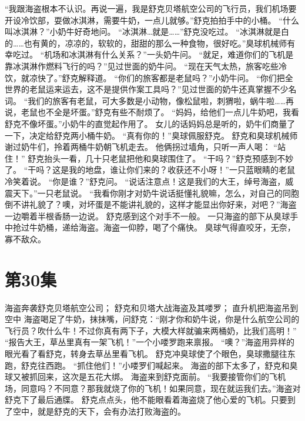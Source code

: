 \documentclass[a4paper,12pt,UTF8,twoside]{ctexbook}
\begin{document}
        “我跟海盗根本不认识。再说一遍，我是舒克贝塔航空公司的飞行员，我们机场要开设冷饮部，耍做冰淇淋，需要牛奶，一点儿就够。”舒克拍拍手中的小桶。 
        “什么叫冰淇淋？”小奶牛好奇地问。 
        “冰淇淋…就是……”舒克没吃过。 
        “冰淇淋就是白的……也有黄的，凉凉的，软软的，甜甜的那么一种食物，很好吃。”臭球机械师有幸吃过。 
        “机场和冰淇淋有什么关系？”一头奶牛问。 
        “就足，难道你们的飞机是靠冰淇淋作燃料飞行的吗？”见过世面的奶牛问。 
        “现在天气太热，旅客吃些冷饮，就凉快了。”舒克解释道。 
        “你们的旅客都是老鼠吗？”小奶牛问。 
        “你们把全世界的老鼠运来运去，这不是提供作案工具吗？”见过世面的奶牛还真掌握不少名词。 
        “我们的旅客有老鼠，可大多数是小动物，像松鼠啦，刺猬啦，蜗牛啦……再说，老鼠也不全是坏蛋。”舒克有些不耐烦了。 
        “妈妈，给他们一点儿牛奶吧，我看舒克不像坏蛋。”小奶牛的直觉起作用了。 
        女儿的话妈妈总是听的，奶牛们商量了一下，决定给舒克两小桶牛奶。 
        “真有你的！”臭球佩服舒克。 
        舒克和臭球机械师谢过奶牛们，拎着两桶牛奶朝飞机走去。 
        他俩拐过墙角，只听一声人喝：  “站住！” 
        舒克抬头一看，几十只老鼠把他和臭球围住了。 
        “干吗？”舒克预感到不妙了。 
        “干吗？这是我的地盘，谁让你们来的？收获还不小呀！”一只蓝眼睛的老鼠冷笑着说。 
        “你是谁？”舒克问。 
        “说话注意点！这是我们的大王，绰号海盗，威震天下。”一只老鼠说。 
        “我看你刚才对奶牛说话挺懂礼貌嘛，怎么，对自己的同胞倒不讲礼貌了？噢，对坏蛋是不能讲礼貌的，这样才能显出你好来，对吧？”海盗一边嚼着半根香肠一边说。 
        舒克感到这个对手不一般。 
        一只海盗的部下从臭球手中抢过牛奶桶，递给海盗。海盗一仰脖，喝了个痛快。 
        臭球气得直咬牙，无奈，寡不敌众。   \chapter{第30集} 
        海盗奔袭舒克贝塔航空公司； 
        舒克和贝塔大战海盗及其喽罗； 
        直升机把海盗吊到空中   
        海盗喝足了牛奶，抹抹嘴，问舒克：“刚才你和奶牛说，你是什么航空公司的飞行员？吹什么牛！不过你真有两下子，大模大样就骗来两桶奶，比我们高明！” 
        “报告大王，草丛里真有一架飞机！”一个小喽罗跑来禀报。 
        “噢？”海盗用异样的眼光看了看舒克，转身去草丛里看飞机。 
        舒克冲臭球使了个眼色，臭球撒腿往东跑，舒克往西跑。 
        “抓住他们！”小喽罗们喊起来。 
        海盗的部下太多了，舒克和臭球又被抓回来，这次是五花大绑。 
        海盗来到舒克面前。 
        “我要接管你们的飞机场，同意吗？不同意？那我就烧了你的飞机！如果同意，现在就运我们去。”海盗对舒克下了最后通牒。 
        舒克点点头，他不能眼看着海盗烧了他心爱的飞机。只要到了空中，就是舒克的天下，会有办法打败海盗的。 
\end{document}
